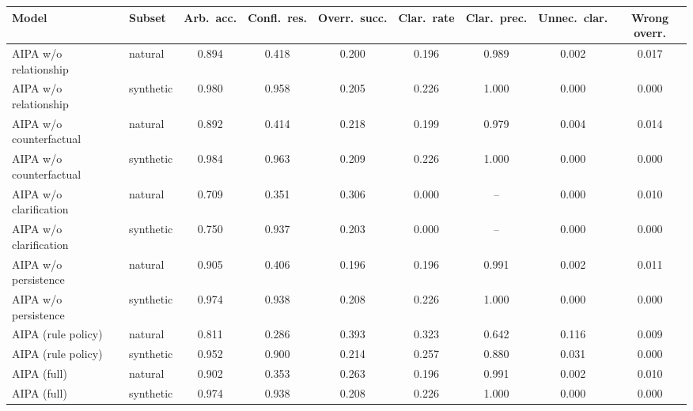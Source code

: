 \begin{tabular}{llccccccc}
\toprule
Model & Subset & Arb.\ acc. & Confl.\ res. & Overr.\ succ. & Clar.\ rate & Clar.\ prec. & Unnec.\ clar. & Wrong overr. \\
\midrule
AIPA w/o relationship & natural & 0.894 & 0.418 & 0.200 & 0.196 & 0.989 & 0.002 & 0.017 \\
AIPA w/o relationship & synthetic & 0.980 & 0.958 & 0.205 & 0.226 & 1.000 & 0.000 & 0.000 \\
AIPA w/o counterfactual & natural & 0.892 & 0.414 & 0.218 & 0.199 & 0.979 & 0.004 & 0.014 \\
AIPA w/o counterfactual & synthetic & 0.984 & 0.963 & 0.209 & 0.226 & 1.000 & 0.000 & 0.000 \\
AIPA w/o clarification & natural & 0.709 & 0.351 & 0.306 & 0.000 & -- & 0.000 & 0.010 \\
AIPA w/o clarification & synthetic & 0.750 & 0.937 & 0.203 & 0.000 & -- & 0.000 & 0.000 \\
AIPA w/o persistence & natural & 0.905 & 0.406 & 0.196 & 0.196 & 0.991 & 0.002 & 0.011 \\
AIPA w/o persistence & synthetic & 0.974 & 0.938 & 0.208 & 0.226 & 1.000 & 0.000 & 0.000 \\
AIPA (rule policy) & natural & 0.811 & 0.286 & 0.393 & 0.323 & 0.642 & 0.116 & 0.009 \\
AIPA (rule policy) & synthetic & 0.952 & 0.900 & 0.214 & 0.257 & 0.880 & 0.031 & 0.000 \\
AIPA (full) & natural & 0.902 & 0.353 & 0.263 & 0.196 & 0.991 & 0.002 & 0.010 \\
AIPA (full) & synthetic & 0.974 & 0.938 & 0.208 & 0.226 & 1.000 & 0.000 & 0.000 \\
\bottomrule
\end{tabular}
